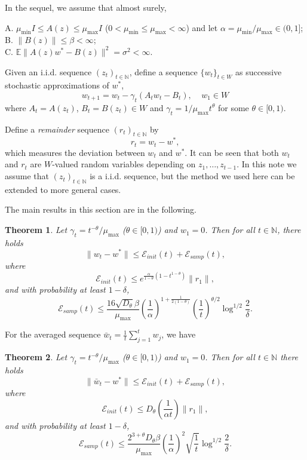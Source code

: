 \documentclass[twoside,twocolumn,journal]{IEEEtran}
\newtheorem{thm}{Theorem}[section]
\newcommand{\DS}{\displaystyle}
\def\N{{\mathbb N}}
\def\E{{\mathbb E}}        %
\def\Err{{\mathscr E}}
\def\amax{{\mu_{\max}}}
\def\amin{{\mu_{\min}} }
\begin{document}
In the sequel, we assume that almost surely,

\medskip

 A. $\amin I\leq  A(z) \leq \amax I$ ($0< \amin\leq \amax < \infty$) and let $\alpha=\amin/\amax\in(0,1]$; \\
B. $\|B(z)\|\leq \beta<\infty$; \\
C. $\E \|A(z) w^\ast - B(z) \|^2 = \sigma^2 <\infty$.

\medskip

Given an i.i.d. sequence $(z_t)_{t\in \N}$, define a sequence $\{w_t\}_{t\in W}$ as successive stochastic approximations of $w^\ast$,
\begin{equation}\label{eq:wt}
w_{t+1} = w_t - \gamma_t (A_t w_t - B_t), \ \ \ \ \ \mbox{$w_1\in W$}
\end{equation}
where $A_t=A(z_t)$, $B_t=B(z_t)\in W$ and $\gamma_t=1/\amax t^{\theta}$ for some $\theta\in [0,1)$.

Define a \emph{remainder} sequence
$(r_t)_{t\in \N}$ by
\[ r_t = w_t - w^\ast, \]
which measures the deviation between $w_t$ and $w^\ast$.
It can be seen that both $w_t$ and $r_t$ are $W$-valued random
variables depending on $z_1,\ldots,z_{t-1}$. In this note we
assume that $(z_t)_{t\in \N}$ is a i.i.d. sequence, but the method
we used here can be extended to more general cases.

The main results in this section are in the following.

\medskip

\begin{thm} \label{thm:robmon}
Let $\gamma_t = t^{-\theta}/\amax$ ($\theta\in [0,1)$) and $w_1=0$. Then for all $t\in \N$, there holds
\[ \| w_{t} - w^\ast \| \leq \Err_{init}(t) + \Err_{samp}(t), \]
where
\[ \Err_{init}(t)\leq e^{\frac{\alpha}{1-\theta}(1-t^{1-\theta})} \|r_1\|, \]
and with probability at least $1-\delta$,
\[ \Err_{samp}(t) \leq \frac{16\sqrt{D_\theta} \beta}{\amax} \left(\frac{1}{\alpha} \right)^{1+\frac{1}{2(1-\theta)}}
\left(\frac{1}{t}\right)^{\theta/2} \log^{1/2}\frac{2}{\delta}. \]
\end{thm}

\medskip

For the averaged sequence $\DS \bar{w}_t = \frac{1}{t} \sum_{j=1}^t w_j$, we have

\medskip

\begin{thm} \label{thm:average}
Let $\DS \gamma_t = t^{-\theta}/\amax$ ($\theta\in [0,1)$) and $w_1=0$. Then for all $t\in \N$ there holds
\[ \| \bar{w}_t -w^\ast \| \leq \Err_{init}(t) + \Err_{samp}(t), \]
where
\[ \Err_{init}(t)\leq  D_\theta \left(\frac{1}{\alpha t} \right)\|r_1\| , \]
and with probability at least $1-\delta$,
\[ \Err_{samp}(t) \leq  \frac{2^{3+\theta} D_\theta \beta}{\amax} \left(\frac{1}{\alpha}\right)^2 \sqrt{\frac{1}{t}} \log^{1/2} \frac{2}{\delta}. \]
\end{thm}
\end{document}
